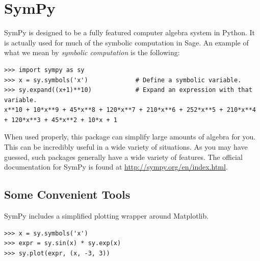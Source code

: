 \label{lab:SymPyAutograd}


\section*{SymPy} %

SymPy is designed to be a fully featured computer algebra system in Python.
It is actually used for much of the symbolic computation in Sage.
An example of what we mean by \emph{symbolic computation} is the following:

\begin{lstlisting}
>>> import sympy as sy
>>> x = sy.symbols('x')             # Define a symbolic variable.
>>> sy.expand((x+1)**10)            # Expand an expression with that variable.
x**10 + 10*x**9 + 45*x**8 + 120*x**7 + 210*x**6 + 252*x**5 + 210*x**4 + 120*x**3 + 45*x**2 + 10*x + 1
\end{lstlisting}

When used properly, this package can simplify large amounts of algebra for you.
This can be incredibly useful in a wide variety of situations.
As you may have guessed, such packages generally have a wide variety of features.
The official documentation for SymPy is found at \url{http://sympy.org/en/index.html}.

\subsection*{Some Convenient Tools} %

SymPy includes a simplified plotting wrapper around Matplotlib.

\begin{lstlisting}
>>> x = sy.symbols('x')
>>> expr = sy.sin(x) * sy.exp(x)
>>> sy.plot(expr, (x, -3, 3))
\end{lstlisting}

